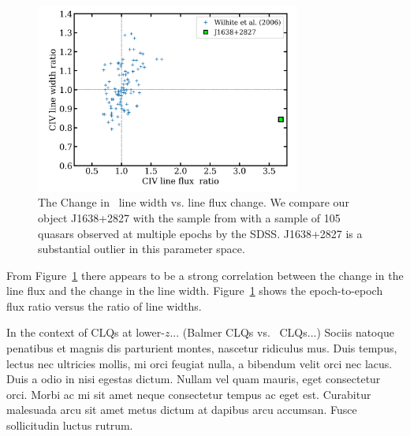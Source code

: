 \documentclass[a4paper,fleqn,usenatbib]{mnras}
\begin{document}
\begin{figure}
  \centering
  \includegraphics[width=8.7cm, trim=0.2cm 0.2cm 0.2cm 0.2cm, clip]
  {figures/Wilhite_2006_Fig2_redux_20190926.png}
   \vspace{-12pt}
  \caption[]{The Change in \civ\ line width vs. line flux change. 
We compare our object J1638+2827 with the sample 
from \citet{Wilhite2006} with a sample of 105 quasars observed at
multiple epochs by the SDSS. J1638+2827 is a substantial outlier 
in this parameter space.}
  \label{fig:Wilhite2006_comparison}
\end{figure}
From Figure~\ref{fig:Wilhite2006_comparison} there appears to be a
strong correlation between the change in the line flux and the change
in the line width.  Figure~\ref{fig:Wilhite2006_comparison} shows the
epoch-to-epoch flux ratio versus the ratio of line widths.

In the context of CLQs at lower-$z$...  
(Balmer CLQs vs. \civ\ CLQs...) 
Sociis natoque penatibus et
magnis dis parturient montes, nascetur ridiculus mus. Duis tempus,
lectus nec ultricies mollis, mi orci feugiat nulla, a bibendum velit
orci nec lacus. Duis a odio in nisi egestas dictum. Nullam vel quam
mauris, eget consectetur orci. Morbi ac mi sit amet neque consectetur
tempus ac eget est. Curabitur malesuada arcu sit amet metus dictum at
dapibus arcu accumsan. Fusce sollicitudin luctus rutrum.  
\end{document}
